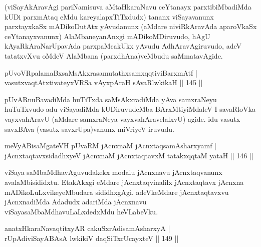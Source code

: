 \begin{artha}
(viSayAkAravAgi pariNamisuva aMtaHkaraNavu ceYtanayx parxtibiMbadiMda kUDi parxmAtaq eMdu kareyalapxTiTxdudx) tananx viSayavanunx parxtayxkaSx mADikoDutAtx yAvudanunx (aMdare niviRkAravAda aparoVkaSx ceYtanayxvanunx) AlaMbaneyanAnxgi mADikoMDiruvudo, hAgU kAyaRkAraNarUpavAda parxpaMcakUkx yAvudu AdhAravAgiruvudo, adeV tatatxvXvu oMdeV AlaMbana (parxdhAna)veMbudu saMmatavAgide.
\end{artha}


\begin{shl}
pUvoVRpalamaBxsaMsAkxrasamutathxsamxqqtiviBarxmAtf |\\
vasutxvaqtAtxtivateyxVRSa vAyxpAraH sAvaRlwkikaH \hfill || 145 ||
\end{shl}

\begin{artha}
pUvARnuBavadiMda huTiTxda saMsAkxradiMda yAva samxraNeyu huTuTxvudo adu viSayadiMda kUDiruvudeMba BArxMtiyiMdaleV I savaRloVka vayxvahAravU (aMdare samxraNeya vayxvahAravelalxvU) agide. idu vasutx savxBAva (vasutx savxrUpa)vanunx miVriyeV iruvudu.
\end{artha}


\begin{shl}
meVyABisaMgateVH pUvaRM jAcnxnaM jAcnxtaqsamAsharxyamf |\\
jAcnxtaqtavxsidadhxyeV jAcnxnaM jAcnxtaqtavxM tatakxqqtaM yataH \hfill || 146 ||
\end{shl}

\begin{artha}
viSaya saMbaMdhavAguvudakekx modalu jAcnxnavu jAcnxtaqvanunx avalaMbisididxtu. EtakAkxgi eMdare jAcnxtaqvinalilx jAcnxtaqtavx jAcnxna mADikoLuLxvikeyeMbudara sididhxgAgi. adeVkeMdare jAcnxtaqtavxvu jAcnxnadiMda Adadudx adariMda jAcnxnavu viSayasaMbaMdhavuLaLxdedxMdu heVLabeVku.
\end{artha}

\begin{shl}
anatxHkaraNavaqtitxyAR cakuSxrAdisamAsharxyA |\\
rUpAdiviSayABAsA lwkikiV daqSiTxrUcayxteV \hfill || 149 ||
\end{shl}

